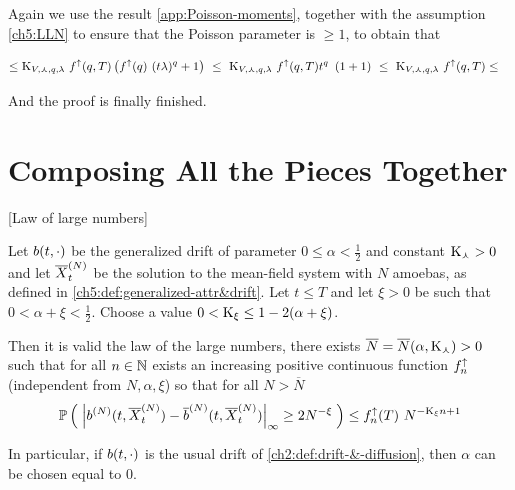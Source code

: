 	Again we use the result \ref{app:Poisson-moments}, together with the assumption \ref{ch5:LLN} to ensure that the Poisson parameter is $\geq1$, to obtain that 
	
	\begin{align*}
		\leq
		\text{K}_{V,\curlywedge,q,\lambda}\
		f^\uparrow(q,T)
			\left(
				f^\uparrow(q)\
				(t\lambda)^q
				+
				1
			\right)\
		&
		\leq\
		\text{K}_{V,\curlywedge,q,\lambda}\
		f^\uparrow(q,T)
		t^q\
			\left(
			1
			+
			1
			\right)\
		\leq\
			\text{K}_{V,\curlywedge,q,\lambda}\
			f^\uparrow(q,T)
		\leq
	\end{align*}
	
	And the proof is finally finished.
	
\section{Composing All the Pieces Together}

\begin{proposition}\label{ch5:LLN}[Law of large numbers]
	
	Let $b(t, \cdot)$ be the generalized drift of parameter $0 \leq \alpha < \frac{1}{2}$ and constant $\text{K}_\curlywedge > 0$ and let $\overline{X}_t^{(N)}$ be the solution to the mean-field system with $N$ amoebas, as defined in \ref{ch5:def:generalized-attr&drift}.
	Let $t\leq T$ and let $\xi >0$ be such that $0 < \alpha + \xi <\frac{1}{2}$.
	Choose a value $0 < \text{K}_\xi \leq 1 - 2(\alpha + \xi)$.
	
	Then it is valid the law of the large numbers, \ie there exists $\overline{N} = \overline{N}(\alpha, \text{K}_\curlywedge) > 0$ such that for all $n \in \mathbb{N}$ exists an increasing positive continuous function $f^\uparrow_n$ (independent from $N, \alpha, \xi$) so that for all $N > \overline{N}$
	\begin{equation}
		\mathbb{P} \left( \; 
			{ \left| 
				b^{(N)}(t, \overline{X}_t^{(N)})
				-
				\overline{b}^{(N)}(t, \overline{X}_t^{(N)})
			 \right|_{\infty} }
			\geq
			2N^{-\xi}
		 \; \right)
		\leq
		f^\uparrow_n(T)\
		N^{-\text{K}_\xi n + 1}
	\end{equation}
	
	In particular, if $b(t, \cdot)$ is the usual drift of \ref{ch2:def:drift-&-diffusion}, then $\alpha$ can be chosen equal to $0$.
\end{proposition}


